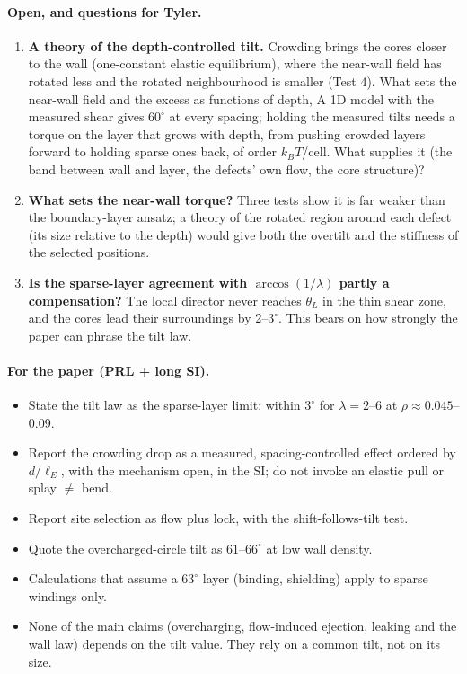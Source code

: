 \documentclass[11pt,a4paper]{article}
\newcommand{\kT}{k_BT}
\begin{document}
\paragraph{Open, and questions for Tyler.}
\begin{enumerate}
\item \textbf{A theory of the depth-controlled tilt.} Crowding brings the cores closer to the wall (one-constant elastic equilibrium), where the
near-wall field has rotated less and the rotated neighbourhood is smaller (Test 4). What sets the near-wall field and the excess as functions of depth,
A 1D model with the measured shear gives $60^\circ$ at every spacing; holding the measured tilts needs a torque on the layer that grows with depth, from
pushing crowded layers forward to holding sparse ones back, of order $\kT$/cell. What supplies it (the band between wall and layer, the defects' own
flow, the core structure)?
\item \textbf{What sets the near-wall torque?} Three tests show it is far weaker than the boundary-layer ansatz; a theory of the rotated region around
each defect (its size relative to the depth) would give both the overtilt and the stiffness of the selected positions.
\item \textbf{Is the sparse-layer agreement with $\arccos(1/\lambda)$ partly a compensation?} The local director never reaches $\theta_L$ in the thin shear zone,
and the cores lead their surroundings by 2--$3^\circ$. This bears on how strongly the paper can phrase the tilt law.
\end{enumerate}

\paragraph{For the paper (PRL + long SI).}
\begin{itemize}
\item State the tilt law as the sparse-layer limit: within $3^\circ$ for $\lambda=2$--6 at $\rho\approx0.045$--0.09.
\item Report the crowding drop as a measured, spacing-controlled effect ordered by $d/\ell_E$, with the mechanism open, in the SI; do not invoke an elastic
pull or splay $\neq$ bend.
\item Report site selection as flow plus lock, with the shift-follows-tilt test.
\item Quote the overcharged-circle tilt as $61$--$66^\circ$ at low wall density.
\item Calculations that assume a $63^\circ$ layer (binding, shielding) apply to sparse windings only.
\item None of the main claims (overcharging, flow-induced ejection, leaking and the wall law) depends on the tilt value. They rely on a common tilt, not on its size.
\end{itemize}
\end{document}
